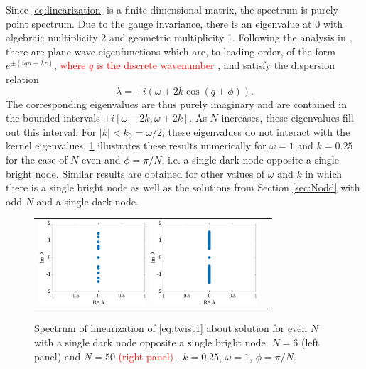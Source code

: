 \documentclass[reprint, amsmath,amssymb,aps,pra]{revtex4-2}
\renewcommand{\revised}[1]{ \textcolor{red}{#1} }
\begin{document}
Since \cref{eq:linearization} is a finite dimensional matrix, the spectrum is purely point spectrum. Due to the gauge invariance, there is an eigenvalue at 0 with algebraic multiplicity 2 and geometric multiplicity 1. Following the analysis in \cite[Section 2.1.1.1]{Kevrekidis2009}, there are plane wave eigenfunctions which are, to leading order, of the form $e^{\pm( i q n + \lambda z)}$, \revised{where $q$ is the discrete wavenumber}, and satisfy the dispersion relation
\begin{equation}\label{eq:dispersion}
\lambda = \pm i \left( \omega + 2 k \cos(q + \phi) \right).
\end{equation}
The corresponding eigenvalues are thus purely imaginary and are contained in the bounded intervals $\pm i[\omega - 2 k, \omega + 2 k]$. As $N$ increases, these eigenvalues fill out this interval. For $|k| < k_0 = \omega/2$, these eigenvalues do not interact with the kernel eigenvalues. \cref{fig:evenholespec} illustrates these results numerically for $\omega = 1$ and $k = 0.25$ for the case of $N$ even and $\phi = \pi/N$, i.e. a single dark node opposite a single bright node. Similar results are obtained for other values of $\omega$ and $k$ in which there is a single bright node as well as the solutions from Section \ref{sec:Nodd} with odd $N$ and a single dark node.
\begin{figure}
\begin{center}
\begin{tabular}{cc}
\includegraphics[width=4cm]{evenhole6spec.eps}
\includegraphics[width=4cm]{evenhole50spec.eps}
\end{tabular}
\end{center}
\caption{Spectrum of linearization of \cref{eq:twist1} about solution for even $N$ with a single dark node opposite a single bright node. $N=6$ (left panel) and $N=50$ \revised{(right panel)}. $k=0.25$, $\omega = 1$, $\phi = \pi/N$.}
\label{fig:evenholespec}
\end{figure}
\end{document}

